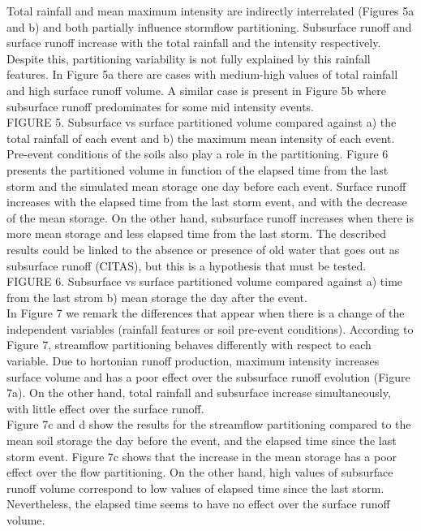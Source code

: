 \documentclass[preprint,12pt]{elsarticle}
\begin{document}
Total rainfall and mean maximum intensity are indirectly interrelated (Figures 5a and b) and both partially influence stormflow partitioning.  Subsurface runoff and surface runoff increase with the total rainfall and the intensity respectively.  Despite this, partitioning variability is not fully explained by this rainfall features.  In Figure 5a there are cases with medium-high values of total rainfall and high surface runoff volume. A similar case is present in Figure 5b where subsurface runoff predominates for some mid intensity events.\\

FIGURE 5. Subsurface vs surface partitioned volume compared against a) the total rainfall of each event and b) the maximum mean intensity of each event.\\

Pre-event conditions of the soils also play a role in the partitioning.  Figure 6 presents the partitioned volume in function of the elapsed time from the last storm and the simulated mean storage one day before each event.  Surface runoff increases with the elapsed time from the last storm event, and with the decrease of the mean storage.  On the other hand, subsurface runoff increases when there is more mean storage and less elapsed time from the last storm. The described results could be linked to the absence or presence of old water that goes out as subsurface runoff (CITAS), but this is a hypothesis that must be tested.\\

FIGURE 6. Subsurface vs surface partitioned volume compared against a) time from the last strom b) mean storage the day after the event.\\

In Figure 7 we remark the differences that appear when there is a change of the independent variables (rainfall features or soil pre-event conditions).  According to Figure 7, streamflow partitioning behaves differently with respect to each variable.  Due to hortonian runoff production, maximum intensity increases surface volume and has a poor effect over the subsurface runoff evolution (Figure 7a).  On the other hand, total rainfall and subsurface increase simultaneously, with little effect over the surface runoff.\\

Figure 7c and d show the results for the streamflow partitioning compared to the mean soil storage the day before the event, and the elapsed time since the last storm event. Figure 7c shows that the increase in the mean storage has a poor effect over the flow partitioning. On the other hand, high values of subsurface runoff volume correspond to low values of elapsed time since the last storm.  Nevertheless, the elapsed time seems to have no effect over the surface runoff volume.\\
\end{document}
